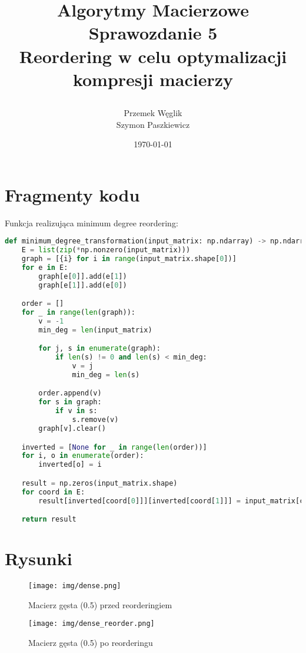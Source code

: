 \documentclass{article}
\title {
        Algorytmy Macierzowe \\
        Sprawozdanie 5 \\
        Reordering w celu optymalizacji kompresji macierzy

}
\author{Przemek Węglik \\ Szymon Paszkiewicz}
\date{\today}
\begin{document}
\maketitle

\newpage

\section{Fragmenty kodu}

Funkcja realizująca minimum degree reordering:

\begin{lstlisting}[language=Python]
    def minimum_degree_transformation(input_matrix: np.ndarray) -> np.ndarray:
    E = list(zip(*np.nonzero(input_matrix)))
    graph = [{i} for i in range(input_matrix.shape[0])]
    for e in E:
        graph[e[0]].add(e[1])
        graph[e[1]].add(e[0])

    order = []
    for _ in range(len(graph)):
        v = -1
        min_deg = len(input_matrix)

        for j, s in enumerate(graph):
            if len(s) != 0 and len(s) < min_deg:
                v = j
                min_deg = len(s)

        order.append(v)
        for s in graph:
            if v in s:
                s.remove(v)
        graph[v].clear()

    inverted = [None for _ in range(len(order))]
    for i, o in enumerate(order):
        inverted[o] = i

    result = np.zeros(input_matrix.shape)
    for coord in E:
        result[inverted[coord[0]]][inverted[coord[1]]] = input_matrix[coord]

    return result
\end{lstlisting}

\section{Rysunki}

\begin{figure}[H]
    \captionsetup{justification=centering}
    \centering
  \texttt{[image: img/dense.png]}
  \caption{Macierz gęsta (0.5) przed reorderingiem}
\end{figure}

\begin{figure}[H]
    \captionsetup{justification=centering}
    \centering
  \texttt{[image: img/dense\_reorder.png]}
  \caption{Macierz gęsta (0.5) po reorderingu}
\end{figure}
\end{document}
